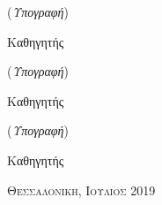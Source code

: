 \begin{titlepage}
\begin{center}
\vspace{4.5mm}
\begin{center}
\noindent
  \begin{minipage}{0.25\linewidth}
   \flushleft
    (\textit{Υπογραφή})
    \\
    \vspace{4.5mm}
    \par
    Καθηγητής
  \end{minipage}%
  \hspace{1.5mm}
  \begin{minipage}{0.3\linewidth}
   \flushleft
    (\textit{Υπογραφή})
    \\
    \vspace{4.5mm}
    \sign{\textbf{}}
    \par
    Καθηγητής
  \end{minipage}%
  \hspace{1.5mm}
  \begin{minipage}{0.3\linewidth}
  \flushleft
    (\textit{Υπογραφή})
    \\
    \vspace{4.5mm}
    \sign{\textbf{}}
    \par
    Καθηγητής
  \end{minipage}%
  \end{center}
  
  \vfill

{\scshape\Large Θεσσαλονικη, Ιουλιος 2019\par}
  \end{center}
\end{titlepage}

\newpage
\cleardoublepage

